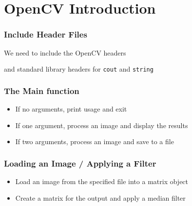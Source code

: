 \section{OpenCV Introduction}






\begin{frame}
\frametitle{Include Header Files}
\begin{center}
We need to include the OpenCV headers

\pause
\vspace{1 em}
and standard library headers for {\tt cout} and {\tt string}

\end{center}

\end{frame}


\begin{frame}
\frametitle{The Main function}
\begin{center}

\begin{itemize}
\item If no arguments, print usage and exit
\item If one argument, process an image and display the results
\item If two arguments, process an image and save to a file
\end{itemize}
\end{center}

\end{frame}


\begin{frame}
\frametitle{Loading an Image / Applying a Filter}
\begin{center}
\begin{itemize}
\item Load an image from the specified file into a matrix object
\end{itemize}

\pause
\begin{itemize}
\item Create a matrix for the output and apply a median filter
\end{itemize}

\end{center}

\end{frame}


